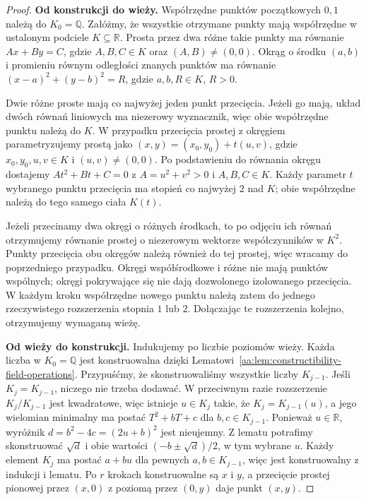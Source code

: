\begin{proof}
\textbf{Od konstrukcji do wieży.}
Współrzędne punktów początkowych $0,1$ należą do
$K_0=\mathbb Q$. Załóżmy, że wszystkie otrzymane
punkty mają współrzędne w ustalonym podciele
$K\subseteq\mathbb R$. Prosta przez dwa różne takie
punkty ma równanie $Ax+By=C$, gdzie $A,B,C\in K$
oraz $(A,B)\ne(0,0)$. Okrąg o środku $(a,b)$
i promieniu równym odległości znanych punktów
ma równanie $(x-a)^2+(y-b)^2=R$, gdzie
$a,b,R\in K$, $R>0$.

Dwie różne proste mają co najwyżej jeden punkt
przecięcia. Jeżeli go mają, układ dwóch równań
liniowych ma niezerowy wyznacznik, więc obie
współrzędne punktu należą do $K$.
W przypadku przecięcia prostej z okręgiem
parametryzujemy prostą jako
$(x,y)=(x_0,y_0)+t(u,v)$, gdzie
$x_0,y_0,u,v\in K$ i $(u,v)\ne(0,0)$.
Po podstawieniu do równania okręgu dostajemy
$At^2+Bt+C=0$ z $A=u^2+v^2>0$ i
$A,B,C\in K$. Każdy parametr $t$ wybranego
punktu przecięcia ma stopień co najwyżej $2$
nad $K$; obie współrzędne należą do tego samego
ciała $K(t)$.

Jeżeli przecinamy dwa okręgi o różnych środkach,
to po odjęciu ich równań otrzymujemy równanie
prostej o niezerowym wektorze współczynników
w $K^2$. Punkty przecięcia obu okręgów
należą również do tej prostej, więc wracamy
do poprzedniego przypadku. Okręgi współśrodkowe
i różne nie mają punktów wspólnych; okręgi
pokrywające się nie dają dozwolonego izolowanego
przecięcia. W każdym kroku współrzędne nowego
punktu należą zatem do jednego rzeczywistego
rozszerzenia stopnia $1$ lub $2$. Dołączając te
rozszerzenia kolejno, otrzymujemy wymaganą wieżę.

\textbf{Od wieży do konstrukcji.}
Indukujemy po liczbie poziomów wieży. Każda liczba
w $K_0=\mathbb Q$ jest konstruowalna dzięki
Lematowi~\ref{aa:lem:constructibility-field-operations}.
Przypuśćmy, że skonstruowaliśmy wszystkie liczby
$K_{j-1}$. Jeśli $K_j=K_{j-1}$, niczego nie
trzeba dodawać. W przeciwnym razie rozszerzenie
$K_j/K_{j-1}$ jest kwadratowe, więc istnieje
$u\in K_j$ takie, że $K_j=K_{j-1}(u)$, a jego
wielomian minimalny ma postać
$T^2+bT+c$ dla $b,c\in K_{j-1}$.
Ponieważ $u\in\mathbb R$, wyróżnik
$d=b^2-4c=(2u+b)^2$ jest nieujemny.
Z lematu potrafimy skonstruować
$\sqrt d$ i obie wartości $(-b\pm\sqrt d)/2$,
w tym wybrane $u$. Każdy element $K_j$ ma postać
$a+bu$ dla pewnych $a,b\in K_{j-1}$,
więc jest konstruowalny z indukcji i lematu.
Po $r$ krokach konstruowalne są $x$ i $y$,
a przecięcie prostej pionowej przez $(x,0)$
z poziomą przez $(0,y)$ daje punkt $(x,y)$.
\end{proof}

